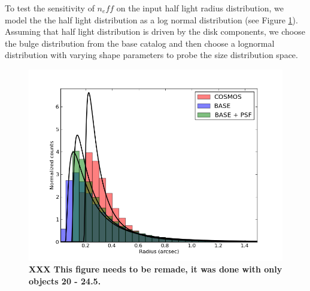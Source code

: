 \documentclass[]{article}
\begin{document}
To test the sensitivity of $n_eff$ on the input half light radius distribution, we model the the half light distribution as a log normal distribution (see Figure
\ref{fig:hl_dist}).  Assuming that half light distribution is driven by the disk components, we choose the bulge distribution from the base catalog and then
choose a lognormal distribution with varying shape parameters to probe the size distribution space.
\begin{figure}
\centering
\includegraphics[width=5in]{validation_figures/ln_fit.png}
\caption{{\bf XXX This figure needs to be remade, it was done with only objects 20 - 24.5.}\label{fig:hl_dist}}
\end{figure}
\end{document}
